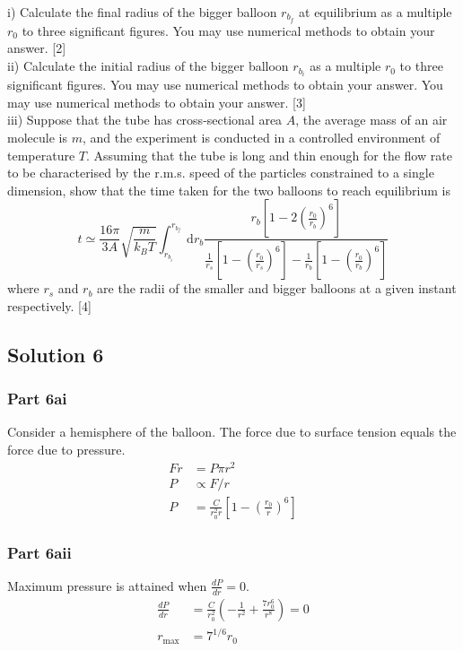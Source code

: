 \documentclass{article}
\begin{document}
i) Calculate the final radius of the bigger balloon $r_{b_{f}}$ at equilibrium as a multiple $r_{0}$ to three significant figures. You may use numerical methods to obtain your answer. [2] \\
ii) Calculate the initial radius of the bigger balloon $r_{b_{i}}$ as a multiple $r_{0}$ to three significant figures. You may use numerical methods to obtain your answer. You may use numerical methods to obtain your answer. [3] \\
iii) Suppose that the tube has cross-sectional area $A$, the average mass of an air molecule is $m$, and the experiment is conducted in a controlled environment of temperature $T$. Assuming that the tube is long and thin enough for the flow rate to be characterised by the r.m.s. speed of the particles constrained to a single dimension, show that the time taken for the two balloons to reach equilibrium is
$$
t \simeq \frac{16 \pi}{3 A} \sqrt{\frac{m}{k_{B} T}} \int_{r_{b_{i}}}^{r_{b_{f}}} \mathrm{~d} r_{b} \frac{r_{b}\left[1-2\left(\frac{r_{0}}{r_{b}}\right)^{6}\right]}{\frac{1}{r_{s}}\left[1-\left(\frac{r_{0}}{r_{s}}\right)^{6}\right]-\frac{1}{r_{b}}\left[1-\left(\frac{r_{0}}{r_{b}}\right)^{6}\right]}
$$
where $r_{s}$ and $r_{b}$ are the radii of the smaller and bigger balloons at a given instant respectively. [4]

\subsection{Solution 6}
\subsubsection{Part 6ai}
Consider a hemisphere of the balloon. The force due to surface tension equals the force due to pressure. 
\begin{align}
    Fr &= P\pi r^2 \\
    P &\propto F/r \\
    P &=\frac{C}{r_{0}^{2} r}\left[1-\left(\frac{r_{0}}{r}\right)^{6}\right]
\end{align}

\subsubsection{Part 6aii}
Maximum pressure is attained when $\frac{dP}{dr}=0$.
\begin{align}
    \frac{dP}{dr} &= \frac{C}{r_0^2}\left(-\frac{1}{r^2} + \frac{7r_0^6}{r^8}\right) = 0 \\
    r_{\max} &= 7^{1/6} r_0
\end{align}
\end{document}
